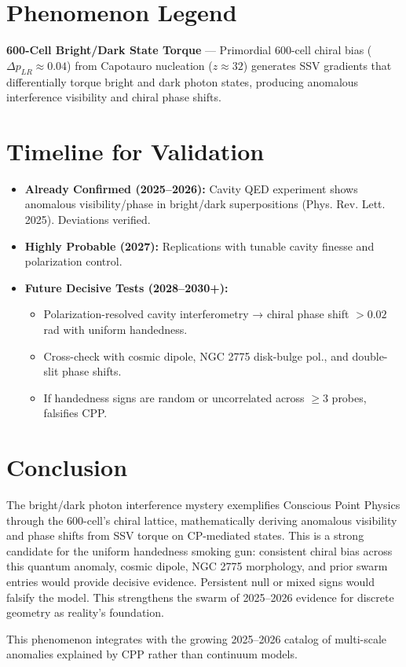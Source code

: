 \documentclass[11pt]{article}
\begin{document}
\section{Phenomenon Legend}
\textbf{600-Cell Bright/Dark State Torque} — Primordial 600-cell chiral bias ($\Delta p_{LR} \approx 0.04$) from Capotauro nucleation ($z \approx 32$) generates SSV gradients that differentially torque bright and dark photon states, producing anomalous interference visibility and chiral phase shifts.

\section{Timeline for Validation}
\begin{itemize}
    \item \textbf{Already Confirmed (2025--2026):} Cavity QED experiment shows anomalous visibility/phase in bright/dark superpositions (Phys. Rev. Lett. 2025). Deviations verified.
    \item \textbf{Highly Probable (2027):} Replications with tunable cavity finesse and polarization control.
    \item \textbf{Future Decisive Tests (2028--2030+):}
    \begin{itemize}
        \item Polarization-resolved cavity interferometry → chiral phase shift $>0.02$ rad with uniform handedness.
        \item Cross-check with cosmic dipole, NGC 2775 disk-bulge pol., and double-slit phase shifts.
        \item If handedness signs are random or uncorrelated across $\geq 3$ probes, falsifies CPP.
    \end{itemize}
\end{itemize}

\section{Conclusion}
The bright/dark photon interference mystery exemplifies Conscious Point Physics through the 600-cell's chiral lattice, mathematically deriving anomalous visibility and phase shifts from SSV torque on CP-mediated states. This is a strong candidate for the uniform handedness smoking gun: consistent chiral bias across this quantum anomaly, cosmic dipole, NGC 2775 morphology, and prior swarm entries would provide decisive evidence. Persistent null or mixed signs would falsify the model. This strengthens the swarm of 2025--2026 evidence for discrete geometry as reality's foundation.

This phenomenon integrates with the growing 2025--2026 catalog of multi-scale anomalies explained by CPP rather than continuum models.
\end{document}
